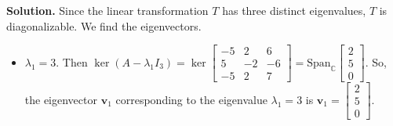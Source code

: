 \documentclass[11pt]{exam}
\newcommand{\Span}{\mathrm{Span}}
\begin{document}
\begin{enumerate}
\iffalse
\bigskip

{\bf Solution.} Since the linear transformation $T$ has three distinct eigenvalues, $T$ is diagonalizable. We find the eigenvectors.
\begin{itemize}
\item $\lambda_1=3$. Then $\ker(A-\lambda_1I_3)=\ker\begin{bmatrix} -5 & 2 & 6 \\ 5 & -2 & -6 \\ -5 &2 &7 \end{bmatrix} = \Span_{\mathbb{C}}\begin{bmatrix} 2 \\ 5 \\ 0 \end{bmatrix} $. So, the eigenvector $\mathbf{v}_1$ corresponding to the eigenvalue $\lambda_1=3$ is $\mathbf{v}_1=\begin{bmatrix} 2 \\ 5 \\ 0 \end{bmatrix}$.


\end{itemize}
\end{enumerate}
\end{document}
